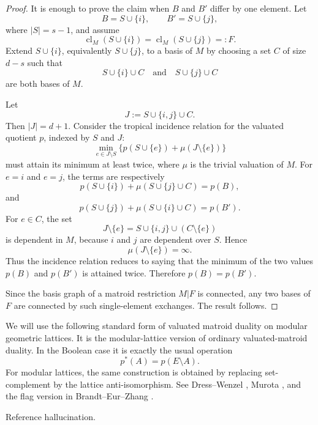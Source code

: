 \documentclass[12pt]{article}
\newcommand{\cl}{\operatorname{cl}}
\theoremstyle{plain}
\theoremstyle{definition}
\newcommand{\review}[1]{\begin{reviewbox}#1\end{reviewbox}}
\begin{document}
\begin{proof}
It is enough to prove the claim when \(B\) and \(B'\) differ by one element.  Let
\[
   B=S\cup\{i\},\qquad B'=S\cup\{j\},
\]
where \(|S|=s-1\), and assume
\[
   \cl_M(S\cup\{i\})=\cl_M(S\cup\{j\})=:F.
\]
Extend \(S\cup\{i\}\), equivalently \(S\cup\{j\}\), to a basis of \(M\) by choosing a set \(C\) of size \(d-s\) such that
\[
   S\cup\{i\}\cup C
   \quad\text{and}\quad
   S\cup\{j\}\cup C
\]
are both bases of \(M\).

Let
\[
   J:=S\cup\{i,j\}\cup C.
\]
Then \(|J|=d+1\).  Consider the tropical incidence relation for the valuated quotient \(p\), indexed by \(S\) and \(J\):
\[
   \min_{e\in J\setminus S}\{p(S\cup\{e\})+\mu(J\setminus\{e\})\}
\]
must attain its minimum at least twice, where \(\mu\) is the trivial valuation of \(M\).  For \(e=i\) and \(e=j\), the terms are respectively
\[
   p(S\cup\{i\})+\mu(S\cup\{j\}\cup C)=p(B),
\]
and
\[
   p(S\cup\{j\})+\mu(S\cup\{i\}\cup C)=p(B').
\]
For \(e\in C\), the set
\[
   J\setminus\{e\}=S\cup\{i,j\}\cup(C\setminus\{e\})
\]
is dependent in \(M\), because \(i\) and \(j\) are dependent over \(S\).  Hence
\[
   \mu(J\setminus\{e\})=\infty.
\]
Thus the incidence relation reduces to saying that the minimum of the two values \(p(B)\) and \(p(B')\) is attained twice.  Therefore \(p(B)=p(B')\).

Since the basis graph of a matroid restriction \(M|F\) is connected, any two bases of \(F\) are connected by such single-element exchanges.  The result follows.
\end{proof}

We will use the following standard form of valuated matroid duality on modular geometric lattices.  It is the modular-lattice version of ordinary valuated-matroid duality.  In the Boolean case it is exactly the usual operation
\[
   p^*(A)=p(E\setminus A).
\]
For modular lattices, the same construction is obtained by replacing set-complement by the lattice anti-isomorphism.  See Dress--Wenzel \cite{DW}, Murota \cite[Ch.~4]{Murota}, and the flag version in Brandt--Eur--Zhang \cite{BEZ}.

\review{Reference hallucination.}
\end{document}
